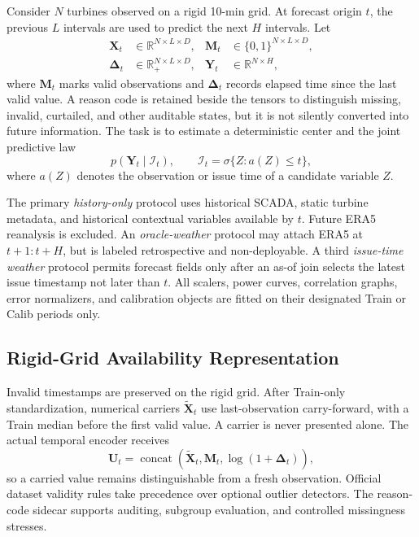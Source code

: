 \documentclass[journal]{IEEEtran}
\newcommand{\R}{\mathbb{R}}
\begin{document}
Consider $N$ turbines observed on a rigid 10-min grid. At forecast origin $t$, the previous $L$ intervals are used to predict the next $H$ intervals. Let
\begin{align}
\bm X_t&\in\R^{N\times L\times D}, &
\bm M_t&\in\{0,1\}^{N\times L\times D},\nonumber\\
\bm\Delta_t&\in\R_+^{N\times L\times D}, &
\bm Y_t&\in\R^{N\times H},
\label{eq:tensors}
\end{align}
where $\bm M_t$ marks valid observations and $\bm\Delta_t$ records elapsed time since the last valid value. A reason code is retained beside the tensors to distinguish missing, invalid, curtailed, and other auditable states, but it is not silently converted into future information. The task is to estimate a deterministic center and the joint predictive law
\begin{equation}
p(\bm Y_t\mid\mathcal I_t),
\qquad
\mathcal I_t=\sigma\{Z:a(Z)\leq t\},
\label{eq:information_set}
\end{equation}
where $a(Z)$ denotes the observation or issue time of a candidate variable $Z$.

The primary \emph{history-only} protocol uses historical SCADA, static turbine metadata, and historical contextual variables available by $t$. Future ERA5 reanalysis is excluded. An \emph{oracle-weather} protocol may attach ERA5 at $t+1{:}t+H$, but is labeled retrospective and non-deployable. A third \emph{issue-time weather} protocol permits forecast fields only after an as-of join selects the latest issue timestamp not later than $t$. All scalers, power curves, correlation graphs, error normalizers, and calibration objects are fitted on their designated Train or Calib periods only.

\subsection{Rigid-Grid Availability Representation}

Invalid timestamps are preserved on the rigid grid. After Train-only standardization, numerical carriers $\tilde{\bm X}_t$ use last-observation carry-forward, with a Train median before the first valid value. A carrier is never presented alone. The actual temporal encoder receives
\begin{equation}
\bm U_t=\operatorname{concat}\!\left(
\tilde{\bm X}_t,\bm M_t,\log(1+\bm\Delta_t)
\right),
\label{eq:availability_input}
\end{equation}
so a carried value remains distinguishable from a fresh observation. Official dataset validity rules take precedence over optional outlier detectors. The reason-code sidecar supports auditing, subgroup evaluation, and controlled missingness stresses.
\end{document}
